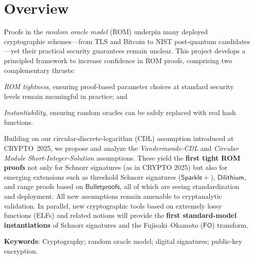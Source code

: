 \documentclass[twoside,envcountsame,runningheads,draft]{llncs}
\begin{document}
 
\vspace{-25mm}
\section{Overview}
Proofs in the \emph{random oracle model} (ROM) underpin many deployed cryptographic
schemes---from TLS and Bitcoin to NIST post-quantum candidates---yet their practical
security guarantees remain unclear. This project develops a principled framework to
increase confidence in ROM proofs, comprising two complementary thrusts:
\begin{newenum}
\item \emph{ROM tightness}, ensuring 
proof-based parameter choices at standard security levels remain meaningful in practice; and
\item \emph{Instantiability}, ensuring random oracles can be safely replaced with
real hash functions.
\end{newenum}
Building on our circular-discrete-logarithm (CDL) assumption introduced at
CRYPTO~2025, we propose and analyze the \emph{Vandermonde-CDL} and \emph{Circular Module
Short-Integer-Solution} assumptions. These yield the \textbf{first tight ROM proofs} not
only for Schnorr signatures (as in CRYPTO 2025) but also for emerging extensions such as
threshold Schnorr signatures ($\mathsf{Sparkle+}$), $\mathsf{Dilithium}$, and range proofs
based on $\mathsf{Bulletproofs}$, all of which are seeing standardization and deployment.
All new assumptions remain amenable to cryptanalytic validation. In parallel, new
cryptographic tools based on extremely lossy functions (ELFs) and related notions will
provide the \textbf{first standard-model instantiations} of Schnorr signatures and the
Fujisaki--Okamoto ($\mathsf{FO}$) transform.

\noindent\textbf{Keywords}: Cryptography; random oracle model; digital signatures;
public-key encryption.
\end{document}
